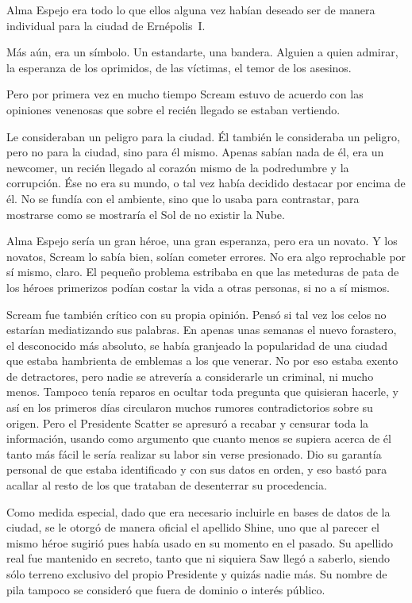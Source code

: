 Alma Espejo era todo lo que ellos alguna vez habían deseado ser de manera individual para la ciudad de Ernépolis~I.

Más aún, era un símbolo. Un estandarte, una bandera. Alguien a quien admirar, la esperanza de los oprimidos, de las víctimas, el temor de los asesinos.

Pero por primera vez en mucho tiempo Scream estuvo de acuerdo con las opiniones venenosas que sobre el recién llegado se estaban vertiendo.

Le consideraban un peligro para la ciudad. Él también le consideraba un peligro, pero no para la ciudad, sino para él mismo. Apenas sabían nada de él, era un newcomer, un recién llegado al corazón mismo de la podredumbre y la corrupción. Ése no era su mundo, o tal vez había decidido destacar por encima de él. No se fundía con el ambiente, sino que lo usaba para contrastar, para mostrarse como se mostraría el Sol de no existir la Nube.

Alma Espejo sería un gran héroe, una gran esperanza, pero era un novato. Y los novatos, Scream lo sabía bien, solían cometer errores. No era algo reprochable por sí mismo, claro. El pequeño problema estribaba en que las meteduras de pata de los héroes primerizos podían costar la vida a otras personas, si no a sí mismos.

Scream fue también crítico con su propia opinión. Pensó si tal vez los celos no estarían mediatizando sus palabras. En apenas unas semanas el nuevo forastero, el desconocido más absoluto, se había granjeado la popularidad de una ciudad que estaba hambrienta de emblemas a los que venerar. No por eso estaba exento de detractores, pero nadie se atrevería a considerarle un criminal, ni mucho menos. Tampoco tenía reparos en ocultar toda pregunta que quisieran hacerle, y así en los primeros días circularon muchos rumores contradictorios sobre su origen. Pero el Presidente Scatter se apresuró a recabar y censurar toda la información, usando como argumento que cuanto menos se supiera acerca de él tanto más fácil le sería realizar su labor sin verse presionado. Dio su garantía personal de que estaba identificado y con sus datos en orden, y eso bastó para acallar al resto de los que trataban de desenterrar su procedencia.

Como medida especial, dado que era necesario incluirle en bases de datos de la ciudad, se le otorgó de manera oficial el apellido Shine, uno que al parecer el mismo héroe sugirió pues había usado en su momento en el pasado. Su apellido real fue mantenido en secreto, tanto que ni siquiera Saw llegó a saberlo, siendo sólo terreno exclusivo del propio Presidente y quizás nadie más. Su nombre de pila tampoco se consideró que fuera de dominio o interés público.


